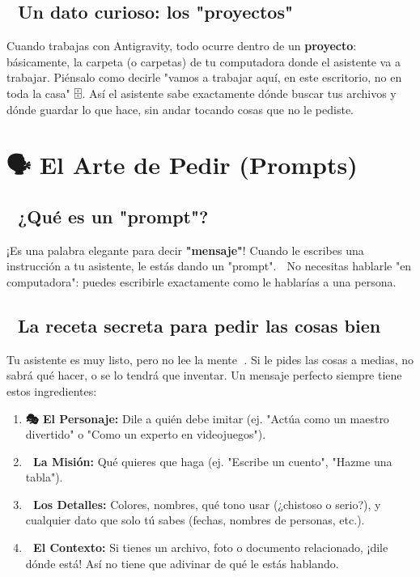 \documentclass[12pt]{article}
\begin{document}
\subsection{📁 Un dato curioso: los "proyectos"}
Cuando trabajas con Antigravity, todo ocurre dentro de un \textbf{proyecto}: básicamente, la carpeta (o carpetas) de tu computadora donde el asistente va a trabajar. Piénsalo como decirle "vamos a trabajar aquí, en este escritorio, no en toda la casa" 🗄️. Así el asistente sabe exactamente dónde buscar tus archivos y dónde guardar lo que hace, sin andar tocando cosas que no le pediste.

\newpage
\section{🗣️ El Arte de Pedir (Prompts)}

\subsection{🤔 ¿Qué es un "prompt"?}
¡Es una palabra elegante para decir \textbf{"mensaje"}! Cuando le escribes una instrucción a tu asistente, le estás dando un "prompt". 📝 No necesitas hablarle "en computadora": puedes escribirle exactamente como le hablarías a una persona.

\subsection{🍰 La receta secreta para pedir las cosas bien}
Tu asistente es muy listo, pero no lee la mente 🧠. Si le pides las cosas a medias, no sabrá qué hacer, o se lo tendrá que inventar. Un mensaje perfecto siempre tiene estos ingredientes:

\begin{enumerate}
    \item \textbf{🎭 El Personaje:} Dile a quién debe imitar (ej. "Actúa como un maestro divertido" o "Como un experto en videojuegos").
    \item \textbf{🎯 La Misión:} Qué quieres que haga (ej. "Escribe un cuento", "Hazme una tabla").
    \item \textbf{🎨 Los Detalles:} Colores, nombres, qué tono usar (¿chistoso o serio?), y cualquier dato que solo tú sabes (fechas, nombres de personas, etc.).
    \item \textbf{📎 El Contexto:} Si tienes un archivo, foto o documento relacionado, ¡dile dónde está! Así no tiene que adivinar de qué le estás hablando.
\end{enumerate}
\end{document}
